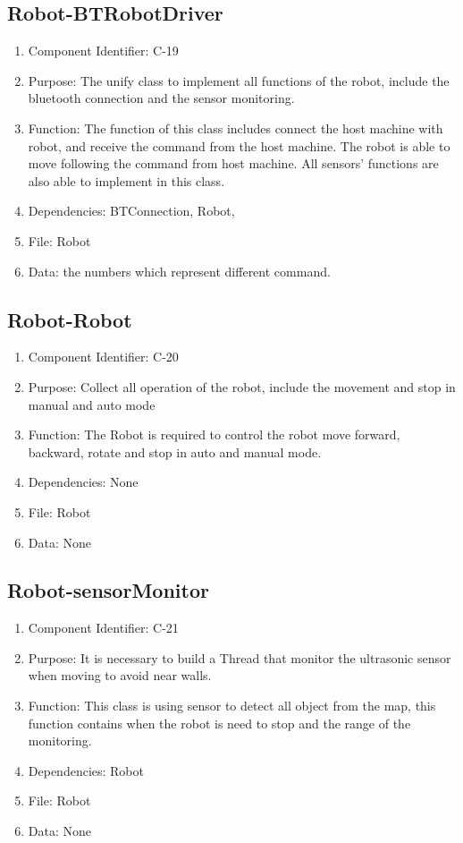 \documentclass[11pt, a4paper]{report}
\begin{document}
\subsection{Robot-BTRobotDriver}
\begin{enumerate}
\item Component Identifier: C-19
\item Purpose: The unify class to implement all functions of the robot, include the bluetooth connection and the sensor monitoring.
\item Function: The function of this class includes connect the host machine with robot, and receive the command from the host machine. The robot is able to move following the command from host machine. All sensors' functions are also able to implement in this class. 
\item Dependencies: BTConnection, Robot,
\item File: Robot
\item Data: the numbers which represent different command.
\end{enumerate}

\subsection{Robot-Robot}
\begin{enumerate}
\item Component Identifier: C-20
\item Purpose: Collect all operation of the robot, include the movement and stop in manual and auto mode
\item Function: The Robot is required to control the robot move forward, backward, rotate and stop in auto and manual mode.
\item Dependencies: None
\item File: Robot
\item Data: None
\end{enumerate}

\subsection{Robot-sensorMonitor}
\begin{enumerate}
\item Component Identifier: C-21
\item Purpose: It is necessary to build  a Thread that monitor the ultrasonic sensor when moving to avoid near walls. 
 \item Function: This class is using sensor to detect all object from the map, this function contains when the robot is need to stop and the range of the monitoring.
\item Dependencies: Robot
\item File: Robot
\item Data: None
\end{enumerate}
\end{document}
